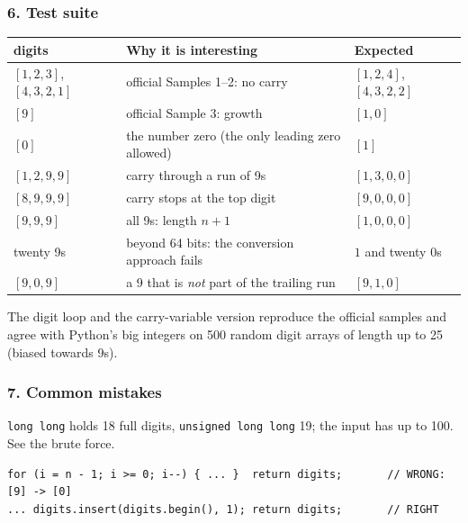 \subsubsection*{6. Test suite}

\begin{testbox}
\centering\small
\begin{tabular}{@{}lll@{}}
\toprule
\textbf{digits} & \textbf{Why it is interesting} & \textbf{Expected} \\
\midrule
$[1,2,3]$, $[4,3,2,1]$ & official Samples 1--2: no carry & $[1,2,4]$, $[4,3,2,2]$ \\
$[9]$ & official Sample 3: growth & $[1,0]$ \\
$[0]$ & the number zero (the only leading zero allowed) & $[1]$ \\
$[1,2,9,9]$ & carry through a run of 9s & $[1,3,0,0]$ \\
$[8,9,9,9]$ & carry stops at the top digit & $[9,0,0,0]$ \\
$[9,9,9]$ & all 9s: length $n+1$ & $[1,0,0,0]$ \\
twenty 9s & beyond 64 bits: the conversion approach fails & $1$ and twenty 0s \\
$[9,0,9]$ & a 9 that is \emph{not} part of the trailing run & $[9,1,0]$ \\
\bottomrule
\end{tabular}

\medskip
The digit loop and the carry-variable version reproduce the official samples and agree with Python's big integers on 500 random digit arrays of length up to 25 (biased towards 9s).
\end{testbox}

\subsubsection*{7. Common mistakes}

\begin{warningbox}
\texttt{long long} holds 18 full digits, \texttt{unsigned long long} 19; the input has up to 100. See the brute force.
\end{warningbox}

\begin{warningbox}
\begin{lstlisting}[style=snippet]
for (i = n - 1; i >= 0; i--) { ... }  return digits;       // WRONG: [9] -> [0]
... digits.insert(digits.begin(), 1); return digits;       // RIGHT
\end{lstlisting}
\end{warningbox}

